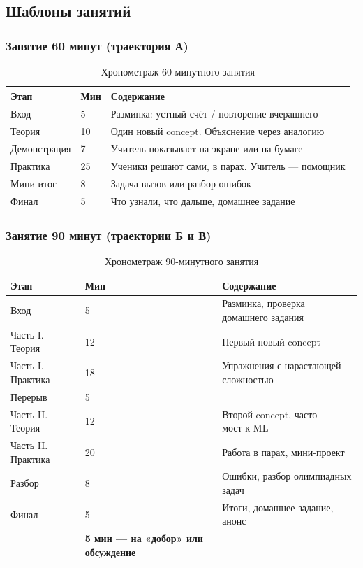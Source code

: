 \documentclass[12pt,a4paper]{article}
\begin{document}
\subsection{Шаблоны занятий}

\subsubsection*{Занятие 60 минут (траектория А)}

\begin{table}[H]
\centering
\caption{Хронометраж 60-минутного занятия}
\begin{tabular}{L{2.2cm}C{1.8cm}L{9.2cm}}
\toprule
\textbf{Этап} & \textbf{Мин} & \textbf{Содержание}\\
\midrule
Вход & 5 & Разминка: устный счёт / повторение вчерашнего\\
Теория & 10 & Один новый concept. Объяснение через аналогию\\
Демонстрация & 7 & Учитель показывает на экране или на бумаге\\
Практика & 25 & Ученики решают сами, в парах. Учитель --- помощник\\
Мини-итог & 8 & Задача-вызов или разбор ошибок\\
Финал & 5 & Что узнали, что дальше, домашнее задание\\
\bottomrule
\end{tabular}
\end{table}

\subsubsection*{Занятие 90 минут (траектории Б и В)}

\begin{table}[H]
\centering
\caption{Хронометраж 90-минутного занятия}
\begin{tabular}{L{2.4cm}C{1.6cm}L{9.2cm}}
\toprule
\textbf{Этап} & \textbf{Мин} & \textbf{Содержание}\\
\midrule
Вход & 5 & Разминка, проверка домашнего задания\\
Часть I. Теория & 12 & Первый новый concept\\
Часть I. Практика & 18 & Упражнения с нарастающей сложностью\\
Перерыв & 5 &\\
Часть II. Теория & 12 & Второй concept, часто --- мост к ML\\
Часть II. Практика & 20 & Работа в парах, мини-проект\\
Разбор & 8 & Ошибки, разбор олимпиадных задач\\
Финал & 5 & Итоги, домашнее задание, анонс\\
\addlinespace
{} & \textbf{5 мин --- на «добор» или обсуждение}\\
\bottomrule
\end{tabular}
\end{table}
\end{document}
